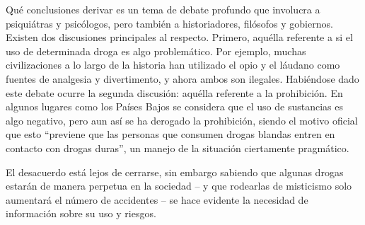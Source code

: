 Qué conclusiones derivar es un tema de debate profundo que involucra a psiquiátras y psicólogos, pero también a historiadores, filósofos y gobiernos. Existen dos discusiones principales al respecto. Primero, aquélla referente a si el uso de determinada droga es algo problemático. Por ejemplo, muchas civilizaciones a lo largo de la historia han utilizado el opio y el láudano como fuentes de analgesia y divertimento, y ahora ambos son ilegales. Habiéndose dado este debate ocurre la segunda discusión: aquélla referente a la prohibición. En algunos lugares como los Países Bajos se considera que el uso de sustancias es algo negativo, pero aun así se ha derogado la prohibición, siendo el motivo oficial que esto \enquote{previene que las personas que consumen drogas blandas entren en contacto con drogas duras}, un manejo de la situación ciertamente pragmático.

El desacuerdo está lejos de cerrarse, sin embargo sabiendo que algunas drogas estarán de manera perpetua en la sociedad – y que rodearlas de misticismo solo aumentará el número de accidentes – se hace evidente la necesidad de información sobre su uso y riesgos.
